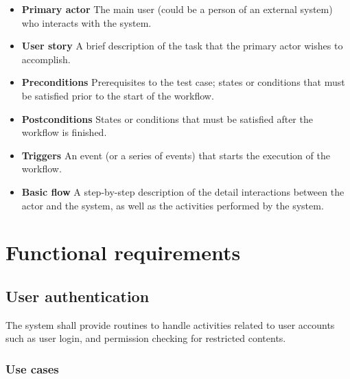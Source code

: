 \begin{itemize}

\item \textbf{Primary actor}
The main user (could be a person of an external system) who interacts with the
system.

\item \textbf{User story}
A brief description of the task that the primary actor wishes to accomplish.

\item \textbf{Preconditions}
Prerequisites to the test case;
states or conditions that must be satisfied prior to the start of the workflow.

\item \textbf{Postconditions}
States or conditions that must be satisfied after the workflow is finished.

\item \textbf{Triggers}
An event (or a series of events) that starts the execution of the workflow.

\item \textbf{Basic flow}
A step-by-step description of the detail interactions between the actor and
the system, as well as the activities performed by the system.

\end{itemize}

\section{Functional requirements}

\subsection{User authentication}

The system shall provide routines to handle activities related to user accounts
such as user login, and permission checking for restricted contents.

\subsubsection{Use cases}

